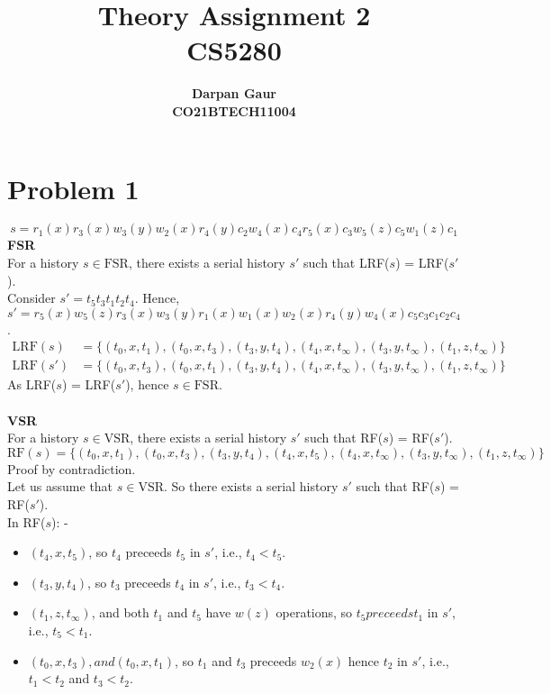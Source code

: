 \documentclass[12pt]{article}
\title{
    \textbf{Theory Assignment 2} \\ 
    \textbf{CS5280} \\
}
\author{
    \textbf{Darpan Gaur} \\
    \textbf{CO21BTECH11004}
}
\date{}
\begin{document}
\maketitle

\hrulefill

\section*{Problem 1}
\begin{equation*}
    s = r_1(x) r_3(x) w_3(y) w_2(x) r_4(y) c_2 w_4(x) c_4 r_5(x) c_3 w_5(z) c_5 w_1(z) c_1
\end{equation*}
\textbf{FSR} \\
For a history $s \in \text{FSR}$, there exists a serial history $s'$ such that LRF($s$) = LRF($s'$).\\
Consider $s' = t_5 t_3 t_1 t_2 t_4$. Hence, $s' = r_5(x) w_5(z) r_3(x) w_3(y) r_1(x) w_1(x) w_2(x) r_4(y) w_4(x) c_5 c_3 c_1 c_2 c_4 $.\\
\begin{equation*}
    \begin{aligned}
        \text{LRF}(s) &= \{(t_0, x, t_1), (t_0, x, t_3), (t_3, y, t_4) , (t_4, x, t_\infty), (t_3, y, t_\infty), (t_1 , z, t_\infty) \} \\
        \text{LRF}(s') &= \{(t_0, x, t_3), (t_0, x, t_1), (t_3, y, t_4), (t_4, x, t_\infty), (t_3, y, t_\infty), (t_1 , z, t_\infty) \}
    \end{aligned}
\end{equation*}
As LRF($s$) = LRF($s'$), hence $s \in \text{FSR}$.\\
\\
\textbf{VSR} \\
For a history $s \in \text{VSR}$, there exists a serial history $s'$ such that RF($s$) = RF($s'$).\\
\begin{equation*}
    \text{RF}(s) = \{(t_0, x, t_1), (t_0, x, t_3), (t_3, y, t_4), (t_4, x, t_5), (t_4, x, t_\infty), (t_3, y, t_\infty), (t_1, z, t_\infty) \}
\end{equation*}
Proof by contradiction. \\
Let us assume that $s \in \text{VSR}$. So there exists a serial history $s'$ such that RF($s$) = RF($s'$).\\
In RF($s$): -
\begin{itemize}
    \item $(t_4, x, t_5)$, so $t_4$ preceeds $t_5$ in $s'$, i.e., $t_4 < t_5$.
    \item $(t_3, y, t_4)$, so $t_3$ preceeds $t_4$ in $s'$, i.e., $t_3 < t_4$.
    \item $(t_1, z, t_\infty)$, and both $t_1$ and $t_5$ have $w(z)$ operations, so $t_5 preceeds t_1$ in $s'$, i.e., $t_5 < t_1$.
    \item $(t_0, x, t_3), and (t_0, x, t_1)$, so $t_1$ and $t_3$ preceeds $w_2(x)$ hence $t_2$ in $s'$, i.e., $t_1 < t_2$ and $t_3 < t_2$.
\end{itemize} 
\end{document}

